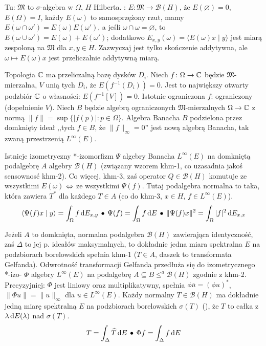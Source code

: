 Tu:  $\mathfrak M$ to $\sigma$-algebra w $\Omega$, $H$ Hilberta. 
: $E \colon \mathfrak M \to \mathcal B(H)$, że $E(\varnothing) = 0$, $E(\Omega) = I$, każdy $E(\omega)$ to samosprzężony rzut, mamy $E(\omega \cap \omega') = E(\omega) E(\omega')$, a jeśli $\omega \cap \omega = \varnothing$, to $E(\omega \cup \omega') = E(\omega) + E(\omega')$; dodatkowo $E_{x,y}(\omega) = \langle E(\omega) x \mid y\rangle$ jest miarą zespoloną na $\mathfrak M$ dla $x, y \in H$.
Zazwyczaj jest tylko skończenie addytywna, ale $\omega \mapsto E(\omega) x$ jest przeliczalnie addytywną miarą.

Topologia $\mathbb{C}$ ma przeliczalną bazę dysków $D_i$.
Niech $f \colon \Omega \to \mathbb{C}$ będzie $\mathfrak M$-mierzalna, $V$ unią tych $D_i$, że $E(f^{-1}(D_i)) = 0$.
Jest to największy otwarty podzbiór $\mathbb{C}$ o własności: $E(f^{-1}[V]) = 0$.
Istotnie ograniczona $f$: ograniczony  (dopełnienie $V$).
Niech $B$ będzie algebrą ograniczonych $\mathfrak M$-mierzalnych $\Omega \to \mathbb{C}$ z normą $\|f\| = \sup\{|f(p)| : p \in \Omega\}$.
Algebra Banacha $B$ podzielona przez domknięty ideał ,,tych $f \in B$, że $\|f\|_\infty = 0$'' jest nową algebrą Banacha, tak zwaną przestrzenią $L^\infty(E)$.

Istnieje izometryczny *-izomorfizm $\Psi$ algebry Banacha $L^\infty(E)$ na domkniętą podalgebrę $A$ algebry $\mathcal B(H)$ (związany wzorem khm-1, co uzasadnia jakoś sensownosć khm-2).
Co więcej, khm-3, zaś operator $Q \in \mathcal B(H)$ komutuje ze wszystkimi $E(\omega)$ $\Leftrightarrow$ ze wszystkimi $\Psi(f)$.
Tutaj podalgebra normalna to taka, która zawiera $T^*$ dla każdego $T \in A$ (co do khm-3, $x \in H$, $f \in L^\infty(E)$).
\[
	\langle \Psi(f) x \mid y \rangle = \int_\Omega f \, \textrm{d} E_{x,y} \, \bullet \,
	\Psi(f) = \int_\Omega f \, \textrm{d} E \, \bullet \,
	\|\Psi(f)x\|^2 = \int_\Omega |f|^2 \, \textrm{d} E_{x,x} 
\]

Jeżeli  $A$ to domknięta, normalna podalgebra $\mathcal B(H)$ zawierająca identyczność, zaś $\Delta$ to jej p. ideałów maksymalnych, to dokładnie jedna miara spektralna $E$ na podzbiorach borelowskich spełnia khm-1 ($T \in A$, daszek to transformata Gelfanda). 
Odwrotność transformacji Gelfanda przedłuża się do izometrycznego *-izo- $\Phi$ algebry $L^\infty(E)$ na podalgebrę $A \subseteq B \le^a \mathcal B(H)$ zgodnie z khm-2.
Precyzyjniej: $\Phi$ jest liniowy oraz multiplikatywny, spełnia $\phi \overline u = (\phi u)^*$, $\|\Phi u\| = \|u\|_\infty$ dla $u \in L^\infty(E)$.
Każdy normalny $T \in \mathcal B(H)$ ma dokładnie jedną miarę spektralną $E$ na podzbiorach borelowskich $\sigma(T)$ (), że $T$ to całka z $\lambda \,\textrm{d} E(\lambda)$ nad $\sigma(T)$.
\[
	T = \int_\Delta \widehat T \,\textrm{d} E \, \bullet \,
	\Phi f = \int_\Delta f \,\textrm{d} E 
\]

